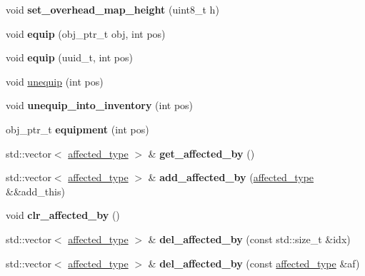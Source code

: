 \begin{DoxyCompactItemize}
void {\bfseries set\+\_\+overhead\+\_\+map\+\_\+height} (uint8\+\_\+t h)
\item 
\mbox{\label{classmods_1_1player_a7100859429762d41f258d69abf957448}} 
void {\bfseries equip} (obj\+\_\+ptr\+\_\+t obj, int pos)
\item 
\mbox{\label{classmods_1_1player_affcfe3327d9526ba8a9b1b9ce100132c}} 
void {\bfseries equip} (uuid\+\_\+t, int pos)
\item 
void \hyperlink{classmods_1_1player_a7fd5d35771a57dfe6c8ec7e1199873ab}{unequip} (int pos)
\item 
\mbox{\label{classmods_1_1player_a77034697db672561d57031c50b35ed9a}} 
void {\bfseries unequip\+\_\+into\+\_\+inventory} (int pos)
\item 
\mbox{\label{classmods_1_1player_add46b348bad812bdc34aeb8d79249ee4}} 
obj\+\_\+ptr\+\_\+t {\bfseries equipment} (int pos)
\item 
\mbox{\label{classmods_1_1player_ab8fe6141a54bcfdb0faa04daee8fb972}} 
std\+::vector$<$ \hyperlink{structaffected__type}{affected\+\_\+type} $>$ \& {\bfseries get\+\_\+affected\+\_\+by} ()
\item 
\mbox{\label{classmods_1_1player_a3f4ba46ea9cc91d8434793efd41a7d90}} 
std\+::vector$<$ \hyperlink{structaffected__type}{affected\+\_\+type} $>$ \& {\bfseries add\+\_\+affected\+\_\+by} (\hyperlink{structaffected__type}{affected\+\_\+type} \&\&add\+\_\+this)
\item 
\mbox{\label{classmods_1_1player_ab1df40b3ba4fd35a3eee15d6ad900d6b}} 
void {\bfseries clr\+\_\+affected\+\_\+by} ()
\item 
\mbox{\label{classmods_1_1player_a15bd12b589620f42a9f6a57b18334142}} 
std\+::vector$<$ \hyperlink{structaffected__type}{affected\+\_\+type} $>$ \& {\bfseries del\+\_\+affected\+\_\+by} (const std\+::size\+\_\+t \&idx)
\item 
\mbox{\label{classmods_1_1player_af3235dd8391fdafec417fddb32f0df2d}} 
std\+::vector$<$ \hyperlink{structaffected__type}{affected\+\_\+type} $>$ \& {\bfseries del\+\_\+affected\+\_\+by} (const \hyperlink{structaffected__type}{affected\+\_\+type} \&af)

\end{DoxyCompactItemize}
